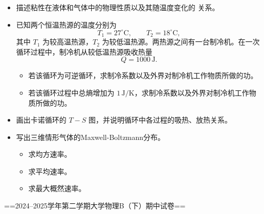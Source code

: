 \begin{itemize}
\item[五、]描述粘性在液体和气体中的物理性质以及其随温度变化的
关系。

    \item[六、] 已知两个恒温热源的温度分别为
\[
T_1=27^\circ\mathrm{C},\qquad T_2=18^\circ\mathrm{C},
\]
其中 $T_1$ 为较高温热源，$T_2$ 为较低温热源。两热源之间有一台制冷机。在一次循环过程中，制冷机从较低温热源吸收热量
\[
Q=1000\,\mathrm{J}.
\]
\begin{itemize}
    \item[(1)] 若该循环为可逆循环，求制冷系数以及外界对制冷机工作物质所做的功。
    \item[(2)] 若该循环过程中总熵增加为 $1\,\mathrm{J/K}$，求制冷系数以及外界对制冷机工作物质所做的功。
\end{itemize}

    \item[七、]画出卡诺循环的 $T-S$ 图，并说明循环中各过程的吸热、放热关系。

    \item[八、]写出三维情形气体的Maxwell-Boltzmann分布。
    \begin{itemize}
        \item[(1)]求均方速率。
        \item[(2)]求平均速率。
        \item[(3)]求最大概然速率。
    \end{itemize}
\end{itemize}

==2024--2025学年第二学期大学物理B（下）期中试卷==

